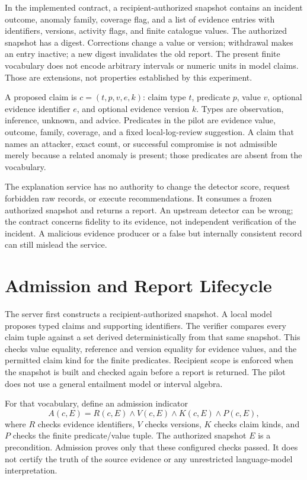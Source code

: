 In the implemented contract, a recipient-authorized snapshot contains an incident outcome, anomaly family, coverage flag, and a list of evidence entries with identifiers, versions, activity flags, and finite catalogue values. The authorized snapshot has a digest. Corrections change a value or version; withdrawal makes an entry inactive; a new digest invalidates the old report. The present finite vocabulary does not encode arbitrary intervals or numeric units in model claims. Those are extensions, not properties established by this experiment.

A proposed claim is $c=(t,p,v,e,k)$: claim type $t$, predicate $p$, value $v$, optional evidence identifier $e$, and optional evidence version $k$. Types are observation, inference, unknown, and advice. Predicates in the pilot are evidence value, outcome, family, coverage, and a fixed local-log-review suggestion. A claim that names an attacker, exact count, or successful compromise is not admissible merely because a related anomaly is present; those predicates are absent from the vocabulary.

The explanation service has no authority to change the detector score, request forbidden raw records, or execute recommendations. It consumes a frozen authorized snapshot and returns a report. An upstream detector can be wrong; the contract concerns fidelity to its evidence, not independent verification of the incident. A malicious evidence producer or a false but internally consistent record can still mislead the service.

\section{Admission and Report Lifecycle}
The server first constructs a recipient-authorized snapshot. A local model proposes typed claims and supporting identifiers. The verifier compares every claim tuple against a set derived deterministically from that same snapshot. This checks value equality, reference and version equality for evidence values, and the permitted claim kind for the finite predicates. Recipient scope is enforced when the snapshot is built and checked again before a report is returned. The pilot does not use a general entailment model or interval algebra.

For that vocabulary, define an admission indicator
\begin{equation}
A(c,E)=R(c,E)\land V(c,E)\land K(c,E)\land P(c,E),
\end{equation}
where $R$ checks evidence identifiers, $V$ checks versions, $K$ checks claim kinds, and $P$ checks the finite predicate/value tuple. The authorized snapshot $E$ is a precondition. Admission proves only that these configured checks passed. It does not certify the truth of the source evidence or any unrestricted language-model interpretation.

